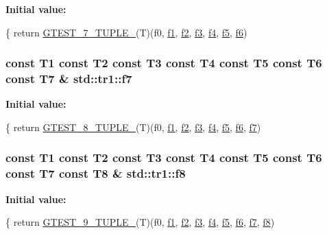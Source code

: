 {\bfseries Initial value\-:}
\begin{DoxyCode}
\{
  \textcolor{keywordflow}{return} \hyperlink{fused-src_2gtest_2gtest_8h_a8987baf82ee028d1d778447413a02c0c}{GTEST\_7\_TUPLE\_}(T)(f0, \hyperlink{namespacestd_1_1tr1_a9c0fa65b105f8e2f58ba59ecf75fd000}{f1}, \hyperlink{namespacestd_1_1tr1_a87dd9e009868361317f587126dba63d4}{f2}, \hyperlink{namespacestd_1_1tr1_a0f7c3b47d27d42d82d1a333ea420ce4e}{f3}, \hyperlink{namespacestd_1_1tr1_adc796e02b7385d526aff708189564f67}{f4}, \hyperlink{namespacestd_1_1tr1_a9c1eb66b2b2fa321942af95405232a0d}{f5}, \hyperlink{namespacestd_1_1tr1_a6b62f32e1e3e21bceb94eb46c4cbfd56}{f6})
\end{DoxyCode}
\hypertarget{namespacestd_1_1tr1_a2185f3a1c07f2df072c39cb91ffa89a4}{
\subsubsection[{f7}]{\setlength{\rightskip}{0pt plus 5cm}const T1 const T2 const T3 const T4 const T5 const T6 const T7 \& std\-::tr1\-::f7}}\label{namespacestd_1_1tr1_a2185f3a1c07f2df072c39cb91ffa89a4}
{\bfseries Initial value\-:}
\begin{DoxyCode}
\{
  \textcolor{keywordflow}{return} \hyperlink{fused-src_2gtest_2gtest_8h_a2bc36d1a71a551e6cda2ac5504fb7ce3}{GTEST\_8\_TUPLE\_}(T)(f0, \hyperlink{namespacestd_1_1tr1_a9c0fa65b105f8e2f58ba59ecf75fd000}{f1}, \hyperlink{namespacestd_1_1tr1_a87dd9e009868361317f587126dba63d4}{f2}, \hyperlink{namespacestd_1_1tr1_a0f7c3b47d27d42d82d1a333ea420ce4e}{f3}, \hyperlink{namespacestd_1_1tr1_adc796e02b7385d526aff708189564f67}{f4}, \hyperlink{namespacestd_1_1tr1_a9c1eb66b2b2fa321942af95405232a0d}{f5}, \hyperlink{namespacestd_1_1tr1_a6b62f32e1e3e21bceb94eb46c4cbfd56}{f6}, 
      \hyperlink{namespacestd_1_1tr1_a2185f3a1c07f2df072c39cb91ffa89a4}{f7})
\end{DoxyCode}
\hypertarget{namespacestd_1_1tr1_ab998afa41cea8d6d26d7e4288b0bf974}{
\subsubsection[{f8}]{\setlength{\rightskip}{0pt plus 5cm}const T1 const T2 const T3 const T4 const T5 const T6 const T7 const T8 \& std\-::tr1\-::f8}}\label{namespacestd_1_1tr1_ab998afa41cea8d6d26d7e4288b0bf974}
{\bfseries Initial value\-:}
\begin{DoxyCode}
\{
  \textcolor{keywordflow}{return} \hyperlink{fused-src_2gtest_2gtest_8h_a1a81c17bfe3cdceb4d56b15985a44a7e}{GTEST\_9\_TUPLE\_}(T)(f0, \hyperlink{namespacestd_1_1tr1_a9c0fa65b105f8e2f58ba59ecf75fd000}{f1}, \hyperlink{namespacestd_1_1tr1_a87dd9e009868361317f587126dba63d4}{f2}, \hyperlink{namespacestd_1_1tr1_a0f7c3b47d27d42d82d1a333ea420ce4e}{f3}, \hyperlink{namespacestd_1_1tr1_adc796e02b7385d526aff708189564f67}{f4}, \hyperlink{namespacestd_1_1tr1_a9c1eb66b2b2fa321942af95405232a0d}{f5}, \hyperlink{namespacestd_1_1tr1_a6b62f32e1e3e21bceb94eb46c4cbfd56}{f6}, 
      \hyperlink{namespacestd_1_1tr1_a2185f3a1c07f2df072c39cb91ffa89a4}{f7}, \hyperlink{namespacestd_1_1tr1_ab998afa41cea8d6d26d7e4288b0bf974}{f8})
\end{DoxyCode}
